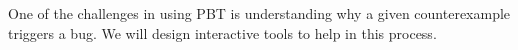 


%
One of the challenges in using PBT is understanding why
a given counterexample triggers a bug.  We will design interactive
tools to help in this process.

